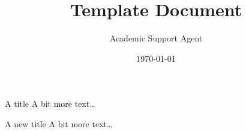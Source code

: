 \documentclass{article}
\title{Template Document}
\author{Academic Support Agent}
\date{\today}
\begin{document}
\maketitle

\begin{frame}{A title}
    A bit more text\ldots
\end{frame}

\begin{frame}{A new title}
    A bit more text\ldots
\end{frame}
\end{document}

